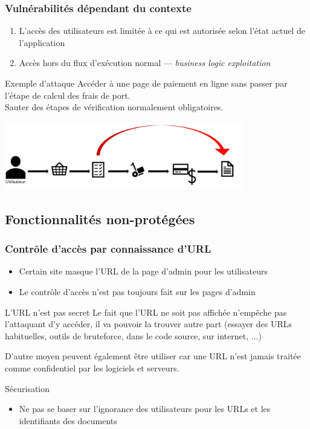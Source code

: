 \documentclass{beamer}
\begin{document}
\begin{frame}
  \frametitle{Vulnérabilités dépendant du contexte}
  \begin{enumerate}
    \item[Vulnérabilité] L'accès des utilisateurs est limitée à ce qui est autorisée selon l'état actuel de l'application
    \item[Type d'attaque] Accès hors du flux d'exécution normal --- \emph{business logic exploitation}
  \end{enumerate}
  \begin{block}{Exemple d'attaque}
    Accéder à une page de paiement en ligne sans passer par l'étape de calcul des frais de port.\\
    Sauter des étapes de vérification normalement obligatoires.
  \end{block}
  \begin{center}
    \includegraphics[height=8em]{escalade-hors-flux}
  \end{center}
\end{frame}



\subsection{Fonctionnalités non-protégées}

\begin{frame}
  \frametitle{Contrôle d'accès par connaissance d'URL}
  \begin{itemize}
    \item Certain site masque l'URL de la page d'admin pour les utilisateurs
    \item Le contrôle d'accès n'est pas toujours fait sur les pages d'admin
  \end{itemize}
  \begin{block}{L'URL n'est pas secret}
    Le fait que l'URL ne soit pas affichée n'empêche pas l'attaquant d'y accéder, il va pouvoir la trouver autre part (essayer des URLs habituelles, outils de bruteforce, dans le code source, sur internet, ...)
    
    D'autre moyen peuvent également être utiliser car une URL n'est jamais traitée comme confidentiel par les logiciels et serveurs.
  \end{block}
  \begin{exampleblock}{Sécurisation}
    \begin{itemize}
      \item Ne pas se baser sur l'ignorance des utilisateurs pour les URLs et les identifiants des documents
    \end{itemize}
  \end{exampleblock}
\end{frame}
\end{document}
